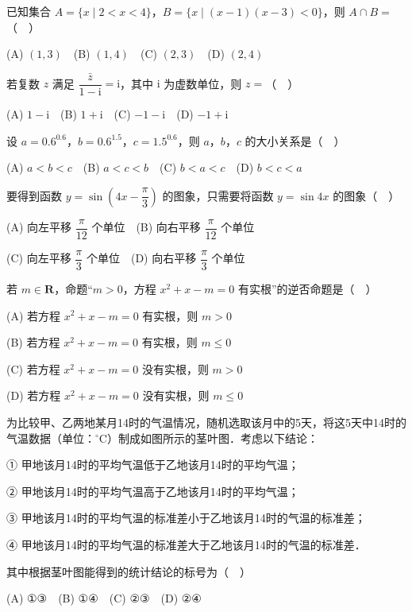 \begin{question}
已知集合 \(A=\{x\mid2<x<4\}\)，\(B=\{x\mid(x-1)(x-3)<0\}\)，则 \(A\cap B=\)（　）

(A) \((1,3)\)　(B) \((1,4)\)　(C) \((2,3)\)　(D) \((2,4)\)

\end{question}
\begin{question}
若复数 \(z\) 满足 \(\dfrac{\bar z}{1-\mathrm{i}}=\mathrm{i}\)，其中 \(\mathrm{i}\) 为虚数单位，则 \(z=\)（　）

(A) \(1-\mathrm{i}\)　(B) \(1+\mathrm{i}\)　(C) \(-1-\mathrm{i}\)　(D) \(-1+\mathrm{i}\)

\end{question}
\begin{question}
设 \(a=0.6^{0.6}\)，\(b=0.6^{1.5}\)，\(c=1.5^{0.6}\)，则 \(a\)，\(b\)，\(c\) 的大小关系是（　）

(A) \(a<b<c\)　(B) \(a<c<b\)　(C) \(b<a<c\)　(D) \(b<c<a\)

\end{question}
\begin{question}
要得到函数 \(y=\sin\left(4x-\dfrac{\pi}{3}\right)\) 的图象，只需要将函数 \(y=\sin4x\) 的图象（　）

(A) 向左平移 \(\dfrac{\pi}{12}\) 个单位　(B) 向右平移 \(\dfrac{\pi}{12}\) 个单位

(C) 向左平移 \(\dfrac{\pi}{3}\) 个单位　(D) 向右平移 \(\dfrac{\pi}{3}\) 个单位

\end{question}
\begin{question}
若 \(m\in\mathbf{R}\)，命题“\(m>0\)，方程 \(x^2+x-m=0\) 有实根”的逆否命题是（　）

(A) 若方程 \(x^2+x-m=0\) 有实根，则 \(m>0\)

(B) 若方程 \(x^2+x-m=0\) 有实根，则 \(m\leqslant0\)

(C) 若方程 \(x^2+x-m=0\) 没有实根，则 \(m>0\)

(D) 若方程 \(x^2+x-m=0\) 没有实根，则 \(m\leqslant0\)

\Needspace{0.4\textheight}
\end{question}
\begin{question}
为比较甲、乙两地某月14时的气温情况，随机选取该月中的5天，将这5天中14时的气温数据（单位：\(^{\circ}\mathrm{C}\)）制成如图所示的茎叶图．考虑以下结论：
\nopagebreak[4]
\begin{center}\end{center}
\nopagebreak[4]
① 甲地该月14时的平均气温低于乙地该月14时的平均气温；

② 甲地该月14时的平均气温高于乙地该月14时的平均气温；

③ 甲地该月14时的平均气温的标准差小于乙地该月14时的气温的标准差；

④ 甲地该月14时的平均气温的标准差大于乙地该月14时的气温的标准差．

其中根据茎叶图能得到的统计结论的标号为（　）

(A) ①③　(B) ①④　(C) ②③　(D) ②④

\end{question}
